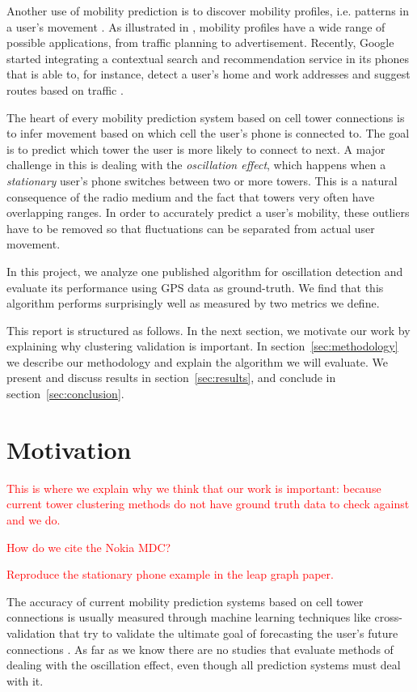\documentclass[letterpaper, 11pt, conference]{ieeeconf}
\newcommand{\xxx}[1]{\textcolor{red}{#1}}
\begin{document}
Another use of mobility prediction is to discover mobility profiles, i.e. patterns in a user's movement \cite{mobilityprofiler}. As illustrated in \cite{mobilityprofiler}, mobility profiles have a wide range of possible applications, from traffic planning to advertisement. Recently, Google started integrating
a contextual search and recommendation service in its phones that is able to, for instance, detect a user's home and work addresses and suggest routes based on
traffic \cite{googleNow}.


The heart of every mobility prediction system based on cell tower connections is to infer movement based on which cell the user's phone is connected to. The goal
is to predict which tower the user is more likely to connect to next. A major challenge in this is dealing with the \textit{oscillation effect}, which happens when a \textit{stationary} user's phone switches between two or more towers. This is a natural consequence of the radio medium and the fact that towers very often have overlapping ranges. In order to accurately predict a user's mobility, these outliers have to be removed so that fluctuations can be separated from actual user movement.

In this project, we analyze one published algorithm for oscillation detection \cite{mobilityprofiler} and evaluate its performance using GPS data as ground-truth. We find that this algorithm performs surprisingly well as measured by two metrics we define.

This report is structured as follows. In the next section, we motivate our work by explaining why clustering validation is important. In section~\ref{sec:methodology} we describe our methodology  and explain the algorithm we will evaluate. We present and discuss results in section~\ref{sec:results}, and conclude in section~\ref{sec:conclusion}.

\section{Motivation}

\xxx{This is where we explain why we think that our work is important: because current tower clustering methods do not have ground truth data to check against and we do.}

\xxx{How do we cite the Nokia MDC?}

\xxx{Reproduce the stationary phone example in the leap graph paper.}

The accuracy of current mobility prediction systems based on cell tower connections is usually measured through machine learning techniques like cross-validation that try to validate the ultimate goal of forecasting the user's future connections \cite{LeapGraph}. As far as we know there are no studies that evaluate methods of dealing with the oscillation effect, even though all prediction systems must deal with it.
\end{document}

